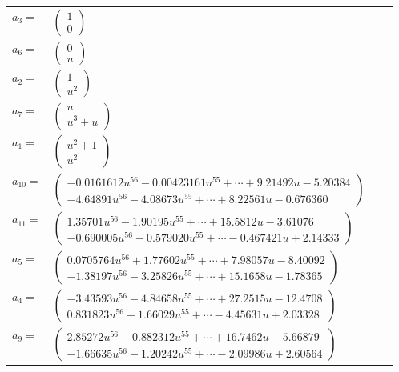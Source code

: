 \documentclass[1p]{elsarticle_modified}
\theoremstyle{definition}
\begin{document}
\begin{tabular}{m{7pt} m{180pt} m{7pt} m{180pt} }
\flushright $a_{3}=$&$\begin{pmatrix}1\\0\end{pmatrix}$ \\
\flushright $a_{6}=$&$\begin{pmatrix}0\\u\end{pmatrix}$ \\
\flushright $a_{2}=$&$\begin{pmatrix}1\\u^2\end{pmatrix}$ \\
\flushright $a_{7}=$&$\begin{pmatrix}u\\u^3+u\end{pmatrix}$ \\
\flushright $a_{1}=$&$\begin{pmatrix}u^2+1\\u^2\end{pmatrix}$ \\
\flushright $a_{10}=$&$\begin{pmatrix}-0.0161612 u^{56}-0.00423161 u^{55}+\cdots+9.21492 u-5.20384\\-4.64891 u^{56}-4.08673 u^{55}+\cdots+8.22561 u-0.676360\end{pmatrix}$ \\
\flushright $a_{11}=$&$\begin{pmatrix}1.35701 u^{56}-1.90195 u^{55}+\cdots+15.5812 u-3.61076\\-0.690005 u^{56}-0.579020 u^{55}+\cdots-0.467421 u+2.14333\end{pmatrix}$ \\
\flushright $a_{5}=$&$\begin{pmatrix}0.0705764 u^{56}+1.77602 u^{55}+\cdots+7.98057 u-8.40092\\-1.38197 u^{56}-3.25826 u^{55}+\cdots+15.1658 u-1.78365\end{pmatrix}$ \\
\flushright $a_{4}=$&$\begin{pmatrix}-3.43593 u^{56}-4.84658 u^{55}+\cdots+27.2515 u-12.4708\\0.831823 u^{56}+1.66029 u^{55}+\cdots-4.45631 u+2.03328\end{pmatrix}$ \\
\flushright $a_{9}=$&$\begin{pmatrix}2.85272 u^{56}-0.882312 u^{55}+\cdots+16.7462 u-5.66879\\-1.66635 u^{56}-1.20242 u^{55}+\cdots-2.09986 u+2.60564\end{pmatrix}$ \\

\end{tabular}
\end{document}
